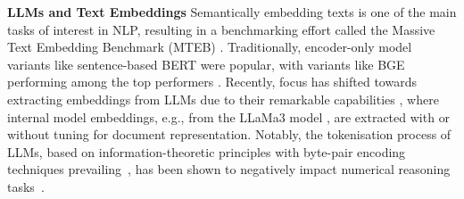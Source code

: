 \textbf{LLMs and Text Embeddings} Semantically embedding texts is one of the main tasks of interest in NLP, resulting in a benchmarking effort called the Massive Text Embedding Benchmark (MTEB) \cite{muennighoff-etal-2023-mteb}. Traditionally, encoder-only model variants like sentence-based BERT \cite{reimers-2019-sentence-bert} were popular, with variants like BGE performing among the top performers \cite{luo2024bgelandmarkembeddingchunkingfree}. Recently, focus has shifted towards extracting embeddings from LLMs due to their remarkable capabilities \cite{kojima2022large}, where internal model embeddings, e.g., from the LLaMa3 model \cite{dubey2024llama}, are extracted with \cite{behnamghader2024llm2vec} or without tuning \cite{jiang2023scalingsentenceembeddingslarge} for document representation. Notably, the tokenisation process of LLMs, based on information-theoretic principles with byte-pair encoding techniques prevailing~\cite{bpe_suboptimal}, has been shown to negatively impact numerical reasoning tasks~\cite{schwartz2024numerologicnumberencodingenhanced}.